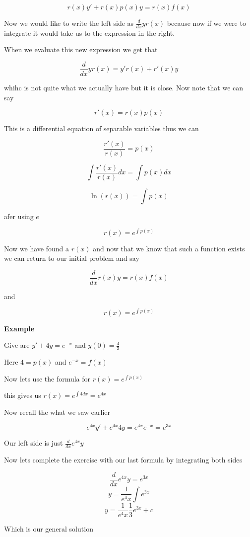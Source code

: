 \[r(x)y' + r(x)p(x)y = r(x)f(x)\]

Now we would like to write the left side as \(\frac{d}{dx} y r(x)\) because now if we
were to integrate it would take us to the expression in the right.

When we evaluate this new expression we get that

\[\frac{d}{dx} y r(x) = y'r(x) + r'(x)y\]

whihc is not quite what we actually have but it is close. Now note that we can say

\[r'(x) = r(x)p(x)\]

This is a differential equation of separable variables thus we can

\[\frac{r'(x)}{r(x)} = p(x)\]

\[\int \frac{r'(x)}{r(x)}dx = \int p(x)dx\]

\[ \ln(r(x)) = \int p(x)\]

afer using \(e\)

\[ r(x) = e^{\int p(x)}\]

Now we have found a \(r(x)\) and now that we know that such a function exists we can return 
to our initial problem and say

\[\frac{d}{dx}r(x)y = r(x)f(x)\]
\begin{center}
\end{center}

and 

\[r(x) = e^{\int p (x) }\]

\textbf{Example}

Give are \(y' + 4y = e^{-x}\) and \(y(0) = \frac{4}{3}\)

Here \(4 = p(x)\) and \(e^{-x} = f(x)\)

Now lets use the formula for \(r(x) = e^{\int p (x)}\)

this gives us \(r(x) = e^{\int 4dx} = e^{4x}\)

Now recall the what we saw earlier

\[e^{4x}y' + e^{4x}4y = e^{4x}e^{-x} = e^{3x}\]

Our left side is just \(\frac{d}{dx} e^{4x}y\)

Now lets complete the exercise with our last formula by integrating both sides

\[\frac{d}{dx} e^{4x}y = e^{3x}\]
\[y = \frac{1}{e^4x}\int e^{3x}\]
\[y = \frac{1}{e^4x} \frac{1}{3}e^{3x} + c\]

Which is our general solution

